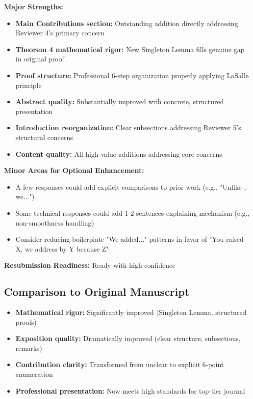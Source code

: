 \documentclass[11pt]{article}
\begin{document}
\textbf{Major Strengths:}
\begin{itemize}
\item \textbf{Main Contributions section:} Outstanding addition directly addressing Reviewer 4's primary concern
\item \textbf{Theorem 4 mathematical rigor:} New Singleton Lemma fills genuine gap in original proof
\item \textbf{Proof structure:} Professional 6-step organization properly applying LaSalle principle
\item \textbf{Abstract quality:} Substantially improved with concrete, structured presentation
\item \textbf{Introduction reorganization:} Clear subsections addressing Reviewer 5's structural concerns
\item \textbf{Content quality:} All high-value additions addressing core concerns
\end{itemize}

\textbf{Minor Areas for Optional Enhancement:}
\begin{itemize}
\item A few responses could add explicit comparisons to prior work (e.g., "Unlike \cite{X}, we...")
\item Some technical responses could add 1-2 sentences explaining mechanism (e.g., non-smoothness handling)
\item Consider reducing boilerplate "We added..." patterns in favor of "You raised X, we address by Y because Z"
\end{itemize}

\textbf{Resubmission Readiness:} \textcolor{success}{Ready with high confidence}

\subsection{Comparison to Original Manuscript}

\begin{itemize}
\item \textbf{Mathematical rigor:} Significantly improved (Singleton Lemma, structured proofs)
\item \textbf{Exposition quality:} Dramatically improved (clear structure, subsections, remarks)
\item \textbf{Contribution clarity:} Transformed from unclear to explicit 6-point enumeration
\item \textbf{Professional presentation:} Now meets high standards for top-tier journal
\end{itemize}
\end{document}
